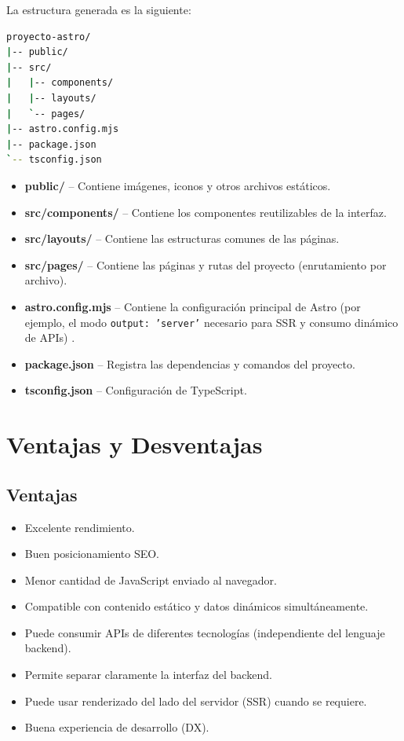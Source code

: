 \documentclass[12pt]{article}
\begin{document}
La estructura generada es la siguiente:

\begin{lstlisting}[style=bash, language=bash]
proyecto-astro/
|-- public/
|-- src/
|   |-- components/
|   |-- layouts/
|   `-- pages/
|-- astro.config.mjs
|-- package.json
`-- tsconfig.json
\end{lstlisting}

\begin{itemize}[leftmargin=*]
  \item \textbf{public/} -- Contiene imágenes, iconos y otros archivos estáticos.
  \item \textbf{src/components/} -- Contiene los componentes reutilizables de la interfaz.
  \item \textbf{src/layouts/} -- Contiene las estructuras comunes de las páginas.
  \item \textbf{src/pages/} -- Contiene las páginas y rutas del proyecto (enrutamiento por archivo).
  \item \textbf{astro.config.mjs} -- Contiene la configuración principal de Astro (por ejemplo, el modo \texttt{output: 'server'} necesario para SSR y consumo dinámico de APIs) \parencite{astro_db_docs}.
  \item \textbf{package.json} -- Registra las dependencias y comandos del proyecto.
  \item \textbf{tsconfig.json} -- Configuración de TypeScript.
\end{itemize}

\section{Ventajas y Desventajas}

\subsection{Ventajas}

\begin{itemize}[leftmargin=*]
  \item Excelente rendimiento.
  \item Buen posicionamiento SEO.
  \item Menor cantidad de JavaScript enviado al navegador.
  \item Compatible con contenido estático y datos dinámicos simultáneamente.
  \item Puede consumir APIs de diferentes tecnologías (independiente del lenguaje backend).
  \item Permite separar claramente la interfaz del backend.
  \item Puede usar renderizado del lado del servidor (SSR) cuando se requiere.
  \item Buena experiencia de desarrollo (DX).
\end{itemize}
\end{document}
